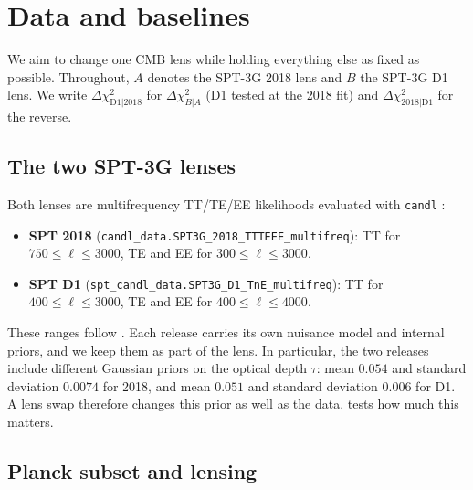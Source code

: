 \documentclass[11pt]{article}
\theoremstyle{remark}
\newcommand{\dchi}{\Delta \chi^2}
\numberwithin{equation}{section}
\begin{document}
 \section{Data and baselines}
\label{sec:baselines}

We aim to change one CMB lens while holding everything else as fixed as possible. Throughout, $A$ denotes the SPT-3G 2018 lens and $B$ the SPT-3G D1 lens. We write $\dchi_{\mathrm{D1}|2018}$ for $\dchi_{B|A}$ (D1 tested at the 2018 fit) and $\dchi_{2018|\mathrm{D1}}$ for the reverse.

\subsection{The two SPT-3G lenses}
\label{sec:spt-lenses}

Both lenses are multifrequency TT/TE/EE likelihoods evaluated with \texttt{candl} \cite{candl}:
\begin{itemize}[leftmargin=*, itemsep=2pt]
  \item \textbf{SPT 2018} \cite{spt3g2018_ttteee} (\texttt{candl\_data.SPT3G\_2018\_TTTEEE\_multifreq}): TT for $750\le\ell\le3000$, TE and EE for $300\le\ell\le3000$.
  \item \textbf{SPT D1} \cite{spt3g_d1} (\texttt{spt\_candl\_data.SPT3G\_D1\_TnE\_multifreq}): TT for $400\le\ell\le3000$, TE and EE for $400\le\ell\le4000$.
\end{itemize}
These ranges follow \cite{arxiv2601_16277}. Each release carries its own nuisance model and internal priors, and we keep them as part of the lens. In particular, the two releases include different Gaussian priors on the optical depth $\tau$: mean $0.054$ and standard deviation $0.0074$ for 2018, and mean $0.051$ and standard deviation $0.006$ for D1. A lens swap therefore changes this prior as well as the data.  tests how much this matters.

\subsection{Planck subset and lensing}
\label{sec:planck-subset}
\end{document}
